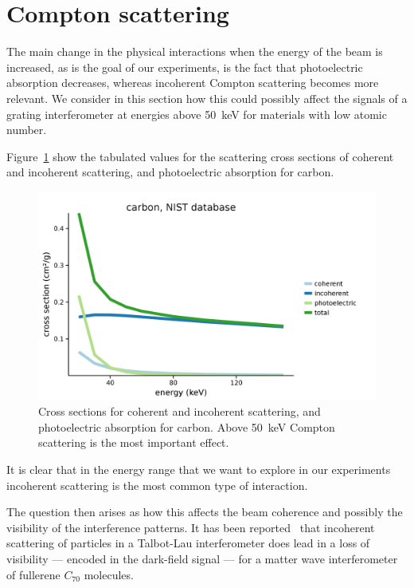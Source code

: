 \section{Compton scattering}
The main change in the physical interactions when the energy of the beam is
increased, as is the goal of our experiments, is the fact that photoelectric
absorption decreases, whereas incoherent Compton scattering becomes more
relevant. We consider in this section how this could possibly affect the
signals of a grating interferometer at energies above \SI{50}{\kilo\eV} for
materials with low atomic number.

Figure~\ref{fig:carbon-cross-sections} show the tabulated values for the
scattering cross sections of coherent and incoherent scattering, and
photoelectric absorption for carbon.

\begin{figure}[htb]
    \centering
    \includegraphics[width=\textwidth]{gfx/compton/carbon_cross_section.png}
    \caption{Cross sections for coherent and incoherent scattering, and
        photoelectric absorption for carbon. Above \SI{50}{\kilo\eV} Compton
    scattering is the most important effect.}
    \label{fig:carbon-cross-sections}
\end{figure}

It is clear that in the energy range that we want to explore in our
experiments incoherent scattering is the most common type of interaction.

The question then arises as how this affects the beam coherence and possibly
the visibility of the interference patterns. It has been
reported~\parencite{PhysRevLett.90.160401} that incoherent scattering of
particles in a Talbot-Lau interferometer does lead in a loss of visibility
--- encoded in the dark-field signal --- for a matter wave interferometer of
fullerene $C_{70}$ molecules.


